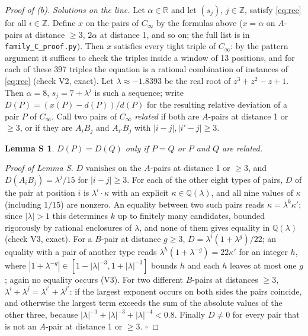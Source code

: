 \documentclass[11pt,a4paper]{article}
\newtheorem*{lemmaS}{Lemma S}
\theoremstyle{definition}
\theoremstyle{remark}
\newcommand{\Z}{\mathbb{Z}}
\newcommand{\Q}{\mathbb{Q}}
\newcommand{\R}{\mathbb{R}}
\newcommand{\file}[1]{\texttt{#1}}
\newcommand{\step}[1]{\smallskip\noindent\emph{#1}}
\begin{document}
\begin{proof}[Proof of (b)]
\step{Solutions on the line.} Let $\alpha \in \R$ and let $(s_j)$, $j \in \Z$, satisfy \eqref{eq:rec} for all
$i \in \Z$. Define $x$ on the pairs of $C_\infty$ by the formulas above ($x = \alpha$ on $A$-pairs at distance
$\ge 3$, $2\alpha$ at distance 1, and so on; the full list is in \file{family\_C\_proof.py}). Then $x$ satisfies
every tight triple of $C_\infty$: by the pattern argument it suffices to check the triples inside a window of 13
positions, and for each of these 397 triples the equation is a rational combination of instances of \eqref{eq:rec}
(check V2, exact). Let $\lambda \approx -1.8393$ be the real root of $z^3 + z^2 - z + 1$. Then $\alpha = 8$,
$s_j = 7 + \lambda^j$ is such a sequence; write $D(P) = (x(P) - d(P))/d(P)$ for the resulting relative deviation of a
pair $P$ of $C_\infty$. Call two pairs of $C_\infty$ \emph{related} if both are $A$-pairs at distance 1 or $\ge 3$,
or if they are $A_iB_j$ and $A_{i'}B_j$ with $|i - j|, |i' - j| \ge 3$.

\begin{lemmaS}
$D(P) = D(Q)$ only if $P = Q$ or $P$ and $Q$ are related.
\end{lemmaS}

\noindent\emph{Proof of Lemma S.} $D$ vanishes on the $A$-pairs at distance 1 or $\ge 3$, and
$D(A_iB_j) = \lambda^j/15$ for $|i - j| \ge 3$. For each of the other eight types of pairs, $D$ of the pair at
position $i$ is $\lambda^i\cdot\kappa$ with an explicit $\kappa \in \Q(\lambda)$, and all nine values of $\kappa$
(including $1/15$) are nonzero. An equality between two such pairs reads $\kappa = \lambda^k \kappa'$; since
$|\lambda| > 1$ this determines $k$ up to finitely many candidates, bounded rigorously by rational enclosures of
$\lambda$, and none of them gives equality in $\Q(\lambda)$ (check V3, exact). For a $B$-pair at distance $g \ge 3$,
$D = \lambda^i(1 + \lambda^g)/22$; an equality with a pair of another type reads
$\lambda^h(1 + \lambda^{-g}) = 22\kappa'$ for an integer $h$, where
$|1 + \lambda^{-g}| \in [1 - |\lambda|^{-3}, 1 + |\lambda|^{-3}]$ bounds $h$ and each $h$ leaves at most one $g$;
again no equality occurs (V3). For two different $B$-pairs at distances $\ge 3$,
$\lambda^i + \lambda^j = \lambda^{i'} + \lambda^{j'}$: if the largest exponent occurs on both sides the pairs
coincide, and otherwise the largest term exceeds the sum of the absolute values of the other three, because
$|\lambda|^{-1} + |\lambda|^{-3} + |\lambda|^{-4} < 0.8$. Finally $D \ne 0$ for every pair that is not an $A$-pair at
distance 1 or $\ge 3$. \hfill$\square$


\end{proof}
\end{document}
